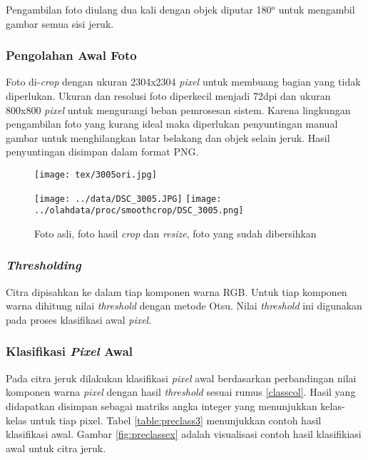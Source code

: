 \documentclass[laporan.tex]{subfiles}
\begin{document}
Pengambilan foto diulang dua kali dengan objek diputar 180$^o$ untuk mengambil gambar semua sisi jeruk.

\subsubsection{Pengolahan Awal Foto}

Foto di-\emph{crop} dengan ukuran 2304x2304 \emph{pixel} untuk membuang bagian yang tidak diperlukan. Ukuran dan resolusi foto diperkecil menjadi 72dpi dan ukuran 800x800 \emph{pixel} untuk mengurangi beban pemrosesan sistem. Karena lingkungan pengambilan foto yang kurang ideal maka diperlukan penyuntingan manual gambar untuk menghilangkan latar belakang dan objek selain jeruk. Hasil penyuntingan disimpan dalam format PNG.

\begin{figure}[h]
\centering
\texttt{[image: tex/3005ori.jpg]}

\vskip 1cm
\texttt{[image: ../data/DSC\_3005.JPG]} \qquad
\texttt{[image: ../olahdata/proc/smoothcrop/DSC\_3005.png]}
\caption{Foto asli, foto hasil \emph{crop} dan \emph{resize}, foto yang sudah dibersihkan}
\end{figure}

\subsubsection{\emph{Thresholding}}

Citra dipisahkan ke dalam tiap komponen warna RGB. Untuk tiap komponen warna dihitung nilai \emph{threshold} dengan metode Otsu. Nilai \emph{threshold} ini digunakan pada proses klasifikasi awal \emph{pixel}.


\subsubsection{Klasifikasi \emph{Pixel} Awal}

Pada citra jeruk dilakukan klasifikasi \emph{pixel} awal berdasarkan perbandingan nilai komponen warna \emph{pixel} dengan hasil \emph{threshold} sesuai rumus \ref{classcol}. Hasil yang didapatkan disimpan sebagai matriks angka integer yang menunjukkan kelas-kelas untuk tiap pixel. Tabel \ref{table:preclass3} menunjukkan contoh hasil klasifikasi awal. Gambar \ref{fig:preclassex} adalah visualisasi contoh hasil klasifikiasi awal untuk citra jeruk.
\end{document}
